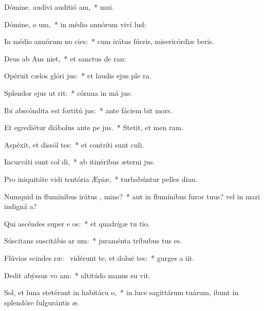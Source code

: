 \item Dómine, audívi auditió am,~*  mui.
\item Dómine, o um,~* in médio annórum viví lud:
\item In médio annórum no cies:~* cum irátus fúeris, misericórdiæ beris.
\item Deus ab Aus niet,~* et sanctus de  ran:
\item Opéruit cælos glóri jus:~* et laudis ejus ple  ra.
\item Splendor ejus ut  rit:~* córnua in má jus:
\item Ibi abscóndita est fortitú jus:~* ante fáciem  bit mors.
\item Et egrediétur diábolus ante pe jus.~* Stetit, et men  ram.
\item Aspéxit, et dissól tes:~* et contríti sunt  culi.
\item Incurváti sunt col di,~* ab itinéribus æterni jus.
\item Pro iniquitáte vidi tentória Æpiæ,~* turbabúntur pelles  dian.
\item Numquid in flumínibus irátus , mine?~* aut in flumínibus furor tuus? vel in mari indigná a?
\item Qui ascéndes super e os:~* et quadrígæ tu tio.
\item Súscitans suscitábis ar um:~* juraménta tríbubus  tus es.
\item Flúvios scindes ræ:~\pscross{} vidérunt te, et dolué tes:~* gurges a iit.
\item Dedit abýssus vo am:~* altitúdo manus su vit.
\item Sol, et luna stetérunt in habitácu o,~* in luce sagittárum tuárum, ibunt in splendóre fulgurántis  æ.
